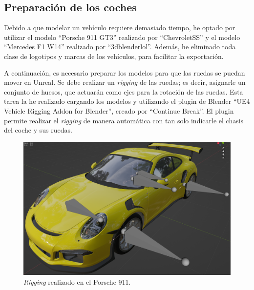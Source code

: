 \subsection{Preparación de los coches}

Debido a que modelar un vehículo requiere demasiado tiempo, he optado por utilizar el modelo ``Porsche 911 GT3''\cite{porsche} realizado por ``ChevroletSS'' y el modelo ``Mercedes F1 W14''\cite{f1} realizado por ``3dblenderlol''. Además, he eliminado toda clase de logotipos y marcas de los vehículos, para facilitar la exportación.

\bigskip

A continuación, es necesario preparar los modelos para que las ruedas se puedan mover en Unreal. Se debe realizar un \textit{rigging} de las ruedas; es decir, asignarle un conjunto de huesos, que actuarán como ejes para la rotación de las ruedas. Esta tarea la he realizado cargando los modelos y utilizando el plugin de Blender ``UE4 Vehicle Rigging Addon for Blender''\cite{blenderplugin}, creado por ``Continue Break''. El plugin permite realizar el \textit{rigging} de manera automática con tan solo indicarle el chasis del coche y sus ruedas.

\begin{figure}[H]
    \centering
    \includegraphics[width=\textwidth]{imagenes/rigging/911-rigging.png}
    \caption{\textit{Rigging} realizado en el Porsche 911.}
    \label{fig:rigging911}
\end{figure}

